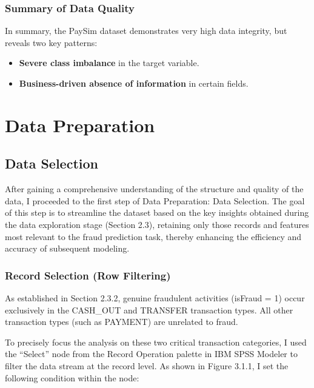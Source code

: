 \documentclass[sigplan,screen]{acmart}
\begin{document}
\subsubsection{Summary of Data Quality}

In summary, the PaySim dataset demonstrates very high data integrity, but reveals two key patterns:

\begin{itemize}
\item \textbf{Severe class imbalance} in the target variable.
\item \textbf{Business-driven absence of information} in certain fields.
\end{itemize}

\section{Data Preparation}

\subsection{Data Selection}
After gaining a comprehensive understanding of the structure and quality of the data, I proceeded to the first step of Data Preparation: Data Selection. The goal of this step is to streamline the dataset based on the key insights obtained during the data exploration stage (Section 2.3), retaining only those records and features most relevant to the fraud prediction task, thereby enhancing the efficiency and accuracy of subsequent modeling.

\subsubsection{Record Selection (Row Filtering)}
As established in Section 2.3.2, genuine fraudulent activities (isFraud = 1) occur exclusively in the CASH\_OUT and TRANSFER transaction types. All other transaction types (such as PAYMENT) are unrelated to fraud.

To precisely focus the analysis on these two critical transaction categories, I used the ``Select'' node from the Record Operation palette in IBM SPSS Modeler to filter the data stream at the record level. As shown in Figure 3.1.1, I set the following condition within the node:

\vspace{0.3cm}
\end{document}
